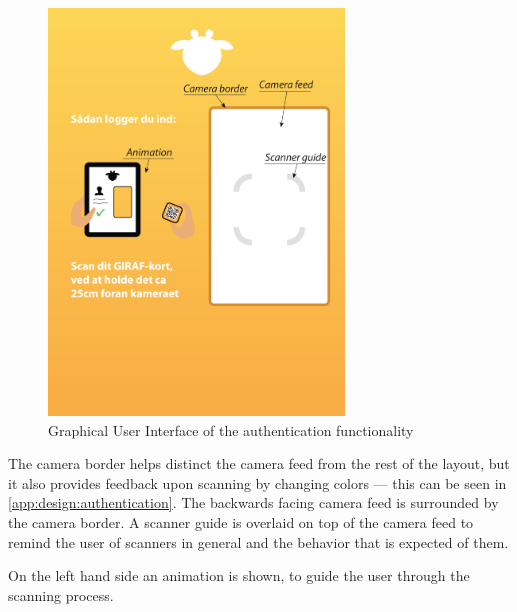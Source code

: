 \begin{figure}[!h]
	\centering
	\includegraphics[width=0.7\textwidth]{gfx/authentication_gui_design_init.pdf}
	\caption{Graphical User Interface of the authentication functionality}
	\label{fig:authentication_gui_design_init}
\end{figure}

The camera border helps distinct the camera feed from the rest of the layout, but it also provides feedback upon scanning by changing colors --- this can be seen in \autoref{app:design:authentication}. 
The backwards facing camera feed is surrounded by the camera border. 
A scanner guide is overlaid on top of the camera feed to remind the user of scanners in general and the behavior that is expected of them.

On the left hand side an animation is shown, to guide the user through the scanning process. 